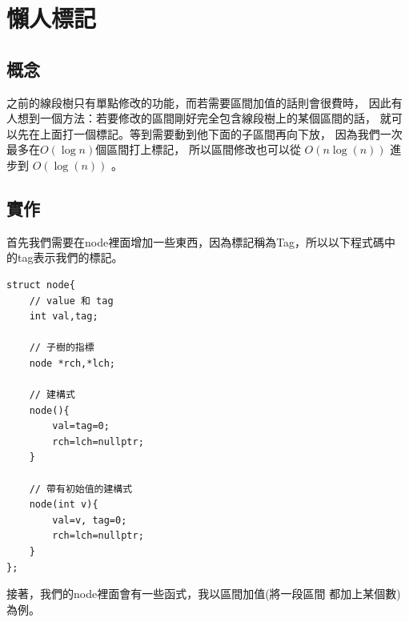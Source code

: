 \section{懶人標記}
    \subsection{概念}
    之前的線段樹只有單點修改的功能，而若需要區間加值的話則會很費時，
    因此有人想到一個方法：若要修改的區間剛好完全包含線段樹上的某個區間的話，
    就可以先在上面打一個標記。等到需要動到他下面的子區間再向下放，
    因為我們一次最多在$O(\log n)$個區間打上標記，
    所以區間修改也可以從 $O(n\log(n))$ 進步到 $O(\log(n))$ 。

    \subsection{實作}
    首先我們需要在node裡面增加一些東西，因為標記稱為Tag，所以以下程式碼中
    的tag表示我們的標記。

\begin{lstlisting}[caption=懶人標記的node]
struct node{
    // value 和 tag
    int val,tag;

    // 子樹的指標
    node *rch,*lch;
    
    // 建構式
    node(){
        val=tag=0;
        rch=lch=nullptr;
    }

    // 帶有初始值的建構式
    node(int v){
        val=v, tag=0;
        rch=lch=nullptr;
    }
};
\end{lstlisting}

    接著，我們的node裡面會有一些函式，我以區間加值(將一段區間
    都加上某個數)為例。

